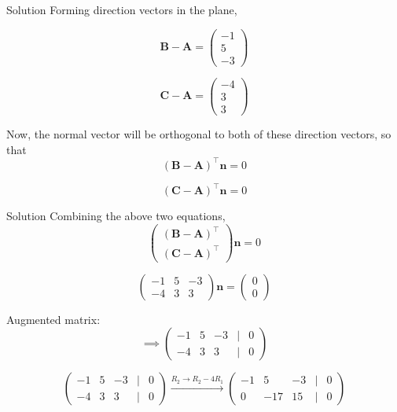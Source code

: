 \documentclass{beamer}
\let\vec\mathbf
\providecommand{\brak}[1]{\ensuremath{\left(#1\right)}}
\theoremstyle{remark}
\newcommand{\myvec}[1]{\ensuremath{\begin{pmatrix}#1\end{pmatrix}}}
\begin{document}
\begin{frame}{Solution}
Forming direction vectors in the plane,

\begin{equation}
\vec{B} - \vec{A} = \myvec{-1\\5\\-3}
\end{equation}

\begin{equation}
\vec{C} - \vec{A} = \myvec{-4\\3\\3}
\end{equation}

Now, the normal vector will be orthogonal to both of these direction vectors, so that
\begin{equation}
    \brak{\vec{B} - \vec{A}}^{\top}\vec{n} = 0
\end{equation}

\begin{equation}
    \brak{\vec{C} - \vec{A}}^{\top}\vec{n} = 0
\end{equation}

\end{frame}

\begin{frame}{Solution}
Combining the above two equations,
\begin{equation}
    \myvec{\brak{\vec{B} - \vec{A}}^{\top}\\ \brak{\vec{C} - \vec{A}}^{\top}}\vec{n} = 0
\end{equation}

\begin{equation}
    \myvec{-1&5&-3\\-4&3&3}\vec{n} = \myvec{0\\0}
\end{equation}

Augmented matrix:
\begin{equation}
    \implies \myvec{-1&5&-3&|&0\\-4&3&3&|&0}
\end{equation}

\begin{equation}
    \myvec{-1&5&-3&|&0\\-4&3&3&|&0} \overset{R_2 \rightarrow R_2 - 4R_1}{\longrightarrow} \myvec{-1&5&-3&|&0\\0&-17&15&|&0}
\end{equation}
\end{frame}
\end{document}
